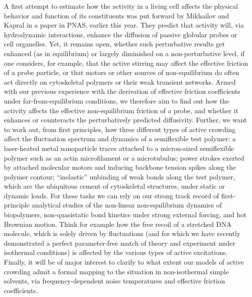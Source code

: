 \begin{workpackage}[id=WPactive,wphases=0-48,
  short=Active Particle Suspensions,%
  title=Probing Active Particle Suspensions with Colloids and Polymers,
  lead=Leipzig,
  LeipzigRM=12]
\begin{tasklist}
\begin{task}[title=Non-Equilibrium Equations of State (NEOS),id=task1,PM=15,lead=Leipzig,wphases=0-30!0.5]
\end{task}

\begin{task}[title=Active Crowding,id=task2,PM=15,lead=Leipzig,wphases=12-42!0.5]
A first attempt to estimate how the activity in a living cell affects the physical behavior
and function of its constituents was put forward by Mikhailov and Kapral in a paper in PNAS,
earlier this year.
%
They predict that activity will, via hydrodynamic interactions, enhance the diffusion of
passive globular probes or cell organelles.
%
Yet, it remains open, whether such perturbative results get enhanced (as in equilibrium) or
largely diminished on a non-perturbative level, if one considers, for example, that the
active stirring may affect the effective friction of a probe particle, or that motors or
other sources of non-equilibrium do often act directly on cytoskeletal polymers or their
weak transient networks.
%
Armed with our previous experience with the derivation of effective friction coefficients
under far-from-equilibrium conditions, we therefore aim to find out how the activity affects
the effective non-equilibrium friction of a probe, and whether it enhances or counteracts
the perturbatively predicted diffusivity.
%
Further, we want to work out, from first principles, how three different types of active
crowding affect the fluctuation spectrum and dynamics of a semiflexible test polymer: a
laser-heated metal nanoparticle tracer attached to a micron-sized semiflexible polymer such
as an actin microfilament or a microtubulus; power strokes exerted by attached molecular
motors and inducing backbone tension spikes along the polymer contour; ``inelastic''
unbinding of weak bonds along the test polymer, which are the ubiquitous cement of
cytoskeletal structures, under static or dynamic loads.
%
For these tasks we can rely on our strong track record of first-principle analytical studies
of the non-linear non-equilibrium dynamics of biopolymers, non-quasistatic bond kinetics
under strong external forcing, and hot Brownian motion.
%
Think for example how the free recoil of a stretched DNA molecule, which is solely driven by
fluctuations (and for which we have recently demonstrated a perfect parameter-free match of
theory and experiment under isothermal conditions) is affected by the various types of
active excitations.
%
Finally, it will be of major interest to clarify to what extent our models of active
crowding admit a formal mapping to the situation in non-isothermal simple solvents, via
frequency-dependent noise temperatures and effective friction coefficients.
\end{task}



\end{tasklist}
\end{workpackage}
